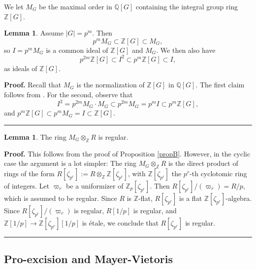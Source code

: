 \documentclass[reqno,11pt,letterpaper]{amsart}
\theoremstyle{plain}
\numberwithin{equation}{subsection}
\newtheorem{lemma}[equation]{Lemma}
\theoremstyle{remark}
\theoremstyle{plain}
\theoremstyle{definition}\newtheorem*{notation}{Notation}
\newcommand{\Q}{{\mathbb Q}}
\newtheorem{lemma}[theorem]{Lemma}
\newenvironment{proof}[1][Proof]{\noindent\textbf{#1.} }{\ \rule{0.5em}{0.5em}}
\newcommand{\BZ}{\mathbb{Z}}
\begin{document}
We let $M_G$ be the maximal order in $\Q[G]$ containing the integral group ring $\BZ[G]$.

 
 
 \begin{lemma}\label{lemma:conductor}
Assume $|G|=p^m$. Then
\[
p^m M_G\subset  \BZ[G]\subset M_G,
\]
so $I=p^mM_G$ is a  common ideal of $\BZ[G]$ and $M_G$. We then also have
\[
 p^{2m}\BZ[G]\subset I^2\subset p^m\BZ[G]\subset I,
\]
as ideals of $\BZ[G]$.
\end{lemma}

 
\begin{proof}
Recall that $M_G$ is the normalization of $\BZ[G]$ in $\Q[G]$. 
 The first claim follows from \cite[Prop. 27.1]{CR90}. 
For the second, observe that 
\[
I^2=p^{2m}M_G\cdot M_G\subset p^{2m}M_G=p^m I\subset p^m\BZ[G],
\]
and $p^m\BZ[G]\subset p^mM_G=I\subset \BZ[G]$.
\end{proof}


\begin{lemma}\label{regular}
The ring $M_G\otimes_\BZ R$ is regular.
\end{lemma}

\begin{proof}  This follows from the proof of Proposition \ref{propB}. However, in the cyclic case the argument is a lot simpler: The ring $  M_G\otimes_\BZ R$ is the direct product of rings of the form $R[\zeta_{p^r}]:=R\otimes_\BZ \BZ[\zeta_{p^r}]$, with $\BZ[\zeta_{p^r}]$ the $p^r$-th cyclotomic ring of integers. Let $\varpi_r$ be a uniformizer of $\BZ_p[\zeta_{p^r}]$. Then 
$
R[\zeta_{p^r}]/(\varpi_r)=R/p,
$
which is assumed to be regular. Since $R$ is $\BZ$-flat,   $R[\zeta_{p^r}]$ is a flat $\BZ[\zeta_{p^r}]$-algebra. Since $R[\zeta_{p^r}]/(\varpi_r)$ is regular, $R[1/p]$ is regular, and $\BZ[1/p]\to \BZ[\zeta_{p^r}][1/p]$ is \'etale, we conclude that $R[\zeta_{p^r}]$ is regular. 
 \end{proof}

 
\subsection{Pro-excision and Mayer-Vietoris} 
\end{document}
